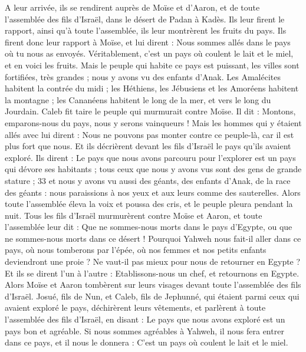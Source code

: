 \begin{multicols}{2}
A leur arrivée, ils se rendirent auprès de Moïse et d’Aaron, et de toute l'assemblée des fils d'Israël, dans le désert de Padan à Kadès. Ils leur firent le rapport, ainsi qu’à toute l'assemblée, ils leur montrèrent les fruits du pays.
Ils firent donc leur rapport à Moïse, et lui dirent : Nous sommes allés dans le pays où tu nous as envoyés. Véritablement, c'est un pays où coulent le lait et le miel, et en voici les fruits.
Mais le peuple qui habite ce pays est puissant, les villes sont fortifiées, très grandes ; nous y avons vu des enfants d’Anak.
Les Amalécites habitent la contrée du midi ; les Héthiens, les Jébusiens et les Amoréens habitent la montagne ; les Cananéens habitent le long de la mer, et vers le long du Jourdain.
Caleb fit taire le peuple qui murmurait contre Moïse. Il dit : Montons, emparons-nous du pays, nous y serons vainqueurs !
Mais les hommes qui y étaient allés avec lui dirent : Nous ne pouvons pas monter contre ce peuple-là, car il est plus fort que nous.
Et ils décrièrent devant les fils d'Israël le pays qu'ils avaient exploré. Ils dirent : Le pays que nous avons parcouru pour l’explorer est un pays qui dévore ses habitants ; tous ceux que nous y avons vus sont des gens de grande stature ; 33 et nous y avons vu aussi des géants, des enfants d’Anak, de la race des géants : nous paraissions à nos yeux et aux leurs comme des sauterelles.
\VerseOne{}Alors toute l'assemblée éleva la voix et poussa des cris, et le peuple pleura pendant la nuit.
Tous les fils d'Israël murmurèrent contre Moïse et Aaron, et toute l'assemblée leur dit : Que ne sommes-nous morts dans le pays d'Egypte, ou que ne sommes-nous morts dans ce désert !
Pourquoi Yahweh nous fait-il aller dans ce pays, où nous tomberons par l'épée, où nos femmes et nos petits enfants deviendront une proie ? Ne vaut-il pas mieux pour nous de retourner en Egypte ?
Et ils se dirent l'un à l'autre : Etablissons-nous un chef, et retournons en Egypte.
Alors Moïse et Aaron tombèrent sur leurs visages devant toute l'assemblée des fils d'Israël.
Josué, fils de Nun, et Caleb, fils de Jephunné, qui étaient parmi ceux qui avaient exploré le pays, déchirèrent leurs vêtements,
et parlèrent à toute l'assemblée des fils d'Israël, en disant : Le pays que nous avons exploré est un pays bon et agréable.
Si nous sommes agréables à Yahweh, il nous fera entrer dans ce pays, et il nous le donnera : C'est un pays où coulent le lait et le miel.

\end{multicols}
